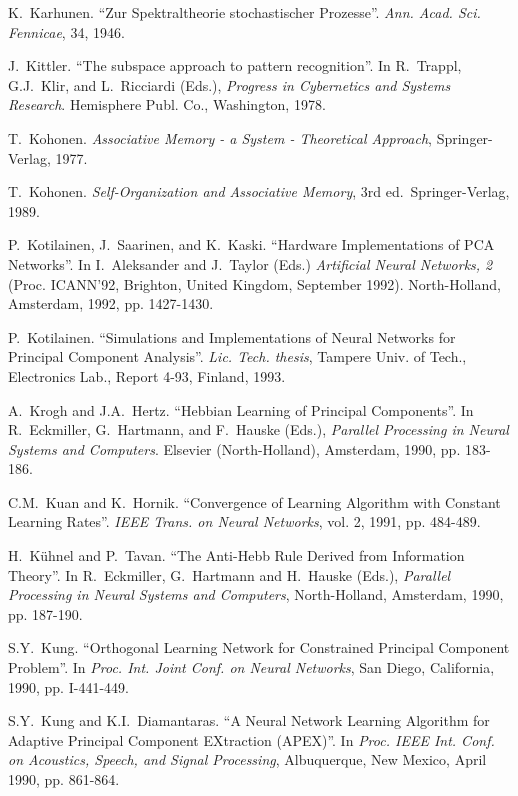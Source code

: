 \begin{thebibliography}{999}
K.~Karhunen.
``Zur Spektraltheorie stochastischer Prozesse''.
{\em Ann. Acad. Sci. Fennicae}, 34, 1946.
 
J.~Kittler.
``The subspace approach to pattern recognition''.
In R.~Trappl, G.J.~Klir, and L.~Ricciardi (Eds.), {\em Progress in
Cybernetics and Systems Research}. Hemisphere Publ. Co., Washington, 1978.
 
T.~Kohonen.
{\em Associative Memory - a System - Theoretical Approach},
Springer-Verlag, 1977.

T.~Kohonen.
{\em Self-Organization and Associative Memory}, 3rd ed.\
Springer-Verlag, 1989.

P.~Kotilainen, J.~Saarinen, and K.~Kaski.
``Hardware Implementations of PCA Networks''.
In I.~Aleksander and J.~Taylor (Eds.) {\em Artificial Neural
Networks, 2} (Proc. ICANN'92, Brighton, United Kingdom, September 1992).
North-Holland, Amsterdam, 1992, pp. 1427-1430.

P.~Kotilainen.
``Simulations and Implementations of Neural Networks for
Principal Component Analysis''.
{\em Lic. Tech. thesis}, Tampere Univ. of Tech., Electronics Lab., Report
4-93, Finland, 1993.
 
A.~Krogh and J.A.~Hertz.
``Hebbian Learning of Principal Components''. 
In R.~Eckmiller, G.~Hartmann, and F.~Hauske (Eds.), {\em Parallel Processing
in Neural Systems and Computers}. Elsevier (North-Holland), Amsterdam,
1990, pp. 183-186.

C.M.~Kuan and K.~Hornik.
``Convergence of Learning Algorithm with Constant Learning Rates''.
{\em IEEE Trans. on Neural Networks}, vol. 2, 1991, pp. 484-489.

H.~K\"uhnel and P.~Tavan.
``The Anti-Hebb Rule Derived from Information Theory''.
In R.~Eckmiller, G.~Hartmann and H.~Hauske (Eds.), {\em Parallel
Processing in Neural Systems and Computers}, North-Holland, 
Amsterdam, 1990, pp. 187-190.

S.Y.~Kung.
``Orthogonal Learning Network for Constrained Principal Component Problem''.
In {\em Proc. Int. Joint Conf. on Neural Networks}, San Diego,
California, 1990, pp. I-441-449.

S.Y.~Kung and K.I.~Diamantaras.
``A Neural Network Learning Algorithm for Adaptive Principal
Component EXtraction (APEX)''.
In {\em Proc. IEEE Int. Conf. on Acoustics, Speech, and Signal Processing},
Albuquerque, New Mexico, April 1990, pp. 861-864.
 

\end{thebibliography}
